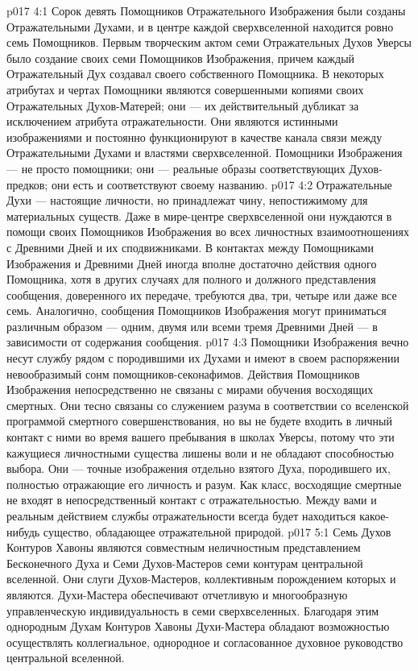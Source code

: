 \vs p017 4:1 Сорок девять Помощников Отражательного Изображения были созданы Отражательными Духами, и в центре каждой сверхвселенной находится ровно семь Помощников. Первым творческим актом семи Отражательных Духов Уверсы было создание своих семи Помощников Изображения, причем каждый Отражательный Дух создавал своего собственного Помощника. В некоторых атрибутах и чертах Помощники являются совершенными копиями своих Отражательных Духов\hyp{}Матерей; они --- их действительный дубликат за исключением атрибута отражательности. Они являются истинными изображениями и постоянно функционируют в качестве канала связи между Отражательными Духами и властями сверхвселенной. Помощники Изображения --- не просто помощники; они --- реальные образы соответствующих Духов\hyp{}предков; они есть  и соответствуют своему названию.
\vs p017 4:2 Отражательные Духи --- настоящие личности, но принадлежат чину, непостижимому для материальных существ. Даже в мире\hyp{}центре сверхвселенной они нуждаются в помощи своих Помощников Изображения во всех личностных взаимоотношениях с Древними Дней и их сподвижниками. В контактах между Помощниками Изображения и Древними Дней иногда вполне достаточно действия одного Помощника, хотя в других случаях для полного и должного представления сообщения, доверенного их передаче, требуются два, три, четыре или даже все семь. Аналогично, сообщения Помощников Изображения могут приниматься различным образом --- одним, двумя или всеми тремя Древними Дней --- в зависимости от содержания сообщения.
\vs p017 4:3 Помощники Изображения вечно несут службу рядом с породившими их Духами и имеют в своем распоряжении невообразимый сонм помощников\hyp{}секонафимов. Действия Помощников Изображения непосредственно не связаны с мирами обучения восходящих смертных. Они тесно связаны со служением разума в соответствии со вселенской программой смертного совершенствования, но вы не будете входить в личный контакт с ними во время вашего пребывания в школах Уверсы, потому что эти кажущиеся личностными существа лишены воли и не обладают способностью выбора. Они --- точные изображения отдельно взятого Духа, породившего их, полностью отражающие его личность и разум. Как класс, восходящие смертные не входят в непосредственный контакт с отражательностью. Между вами и реальным действием службы отражательности всегда будет находиться какое\hyp{}нибудь существо, обладающее отражательной природой.
\vs p017 5:1 Семь Духов Контуров Хавоны являются совместным неличностным представлением Бесконечного Духа и Семи Духов\hyp{}Мастеров семи контурам центральной вселенной. Они слуги Духов\hyp{}Мастеров, коллективным порождением которых и являются. Духи\hyp{}Мастера обеспечивают отчетливую и многообразную управленческую индивидуальность в семи сверхвселенных. Благодаря этим однородным Духам Контуров Хавоны Духи\hyp{}Мастера обладают возможностью осуществлять коллегиальное, однородное и согласованное духовное руководство центральной вселенной.
